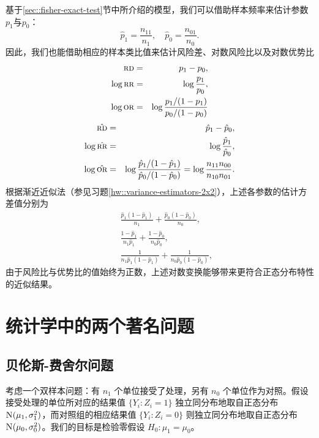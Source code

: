 基于\ref{sec::fisher-exact-test}节中所介绍的模型，我们可以借助样本频率来估计参数$p_1$与$p_0$：
$$
\hat p_1 = \frac{n_{11}}{n_1} ,\quad \hat p_0 = \frac{n_{01}}{n_0}.
$$
因此，我们也能借助相应的样本类比值来估计风险差、对数风险比以及对数优势比
\begin{eqnarray*}
\textsc{rd} &=& p_1 - p_0,\\ 
\log \textsc{rr} &=&\log \frac{ p_1}{p_0},\\ 
\log \textsc{or} &=& \log \frac{ p_1/(1-p_1)}{p_0/(1-p_0)}
\end{eqnarray*}
\begin{eqnarray*}
\hat {\textsc{rd}} &=& \hat  p_1 -\hat  p_0,\\ 
\log \hat {\textsc{rr}} &=& \log\frac{ \hat p_1}{\hat p_0},\\ 
\log \hat {\textsc{or}} &=&\log \frac{ \hat p_1/(1-\hat p_1)}{\hat p_0/(1-\hat p_0)}  = \log\frac{n_{11}n_{00}}{n_{10}n_{01}}.
\end{eqnarray*}
根据渐近近似法（参见习题\ref{hw::variance-estimators-2x2}），上述各参数的估计方差值分别为
\begin{eqnarray*}
&&\frac{ \hat  p_1 (1-\hat  p_1) }{n_1} + \frac{ \hat  p_0 (1-\hat  p_0) }{n_0},\\
&& \frac{   1-\hat  p_1 }{n_1 \hat  p_1} + \frac{   1-\hat  p_0 }{n_0 \hat  p_0 },\\
&& \frac{ 1 }{n_1  \hat  p_1 (1-\hat  p_1)} + \frac{ 1 }{n_0 \hat  p_0 (1-\hat  p_0)},
\end{eqnarray*}
由于风险比与优势比的值始终为正数，上述对数变换能够带来更符合正态分布特性的近似结果。 




\section{统计学中的两个著名问题}



\subsection{贝伦斯-费舍尔问题}\label{sec::bf-problem}



考虑一个双样本问题：有 $n_1$ 个单位接受了处理，另有 $n_0$ 个单位作为对照。假设接受处理的单位所对应的结果值 $\{  Y_i: Z_i = 1 \}$ 独立同分布地取自正态分布 $\textsc{N} (\mu_1, \sigma_1^2)$，而对照组的相应结果值 $\{  Y_i: Z_i = 0 \}$ 则独立同分布地取自正态分布 $\textsc{N} (\mu_0, \sigma_0^2)$。我们的目标是检验零假设 $H_0: \mu_1 = \mu_0$。 



